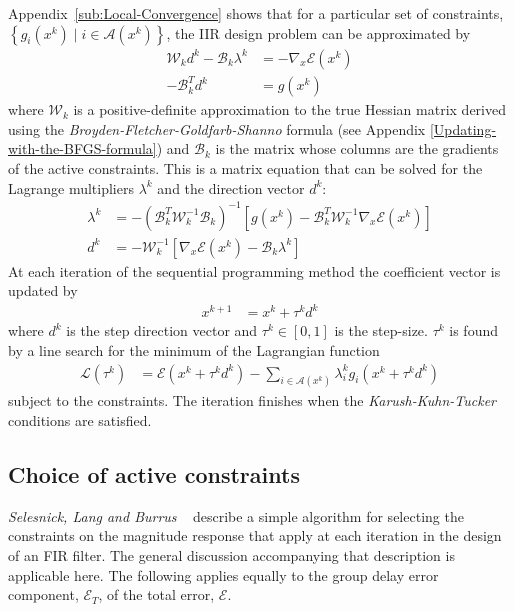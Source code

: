 \documentclass[a4paper,twoside,10pt,english]{report}
\begin{document}
Appendix~\ref{sub:Local-Convergence} shows that for a particular set of 
constraints, 
$\left\{ g_{i}\left(x^{k}\right)\mid i\in\mathcal{A}\left(x^{k}\right)\right\}$,
the IIR design problem can be approximated by 
\begin{align}
\mathcal{W}_{k}d^{k}-\mathcal{B}_{k}\lambda^{k} &= 
-\nabla_{x}\mathcal{E}\left(x^{k}\right)
\label{eqn:IIR-SQP-system}\\
-\mathcal{B}_{k}^{T}d^{k} &= g\left(x^{k}\right)\nonumber 
\end{align}
where $\mathcal{W}_{k}$ is a positive-definite approximation to the true Hessian
matrix derived using the \emph{Broyden-Fletcher-Goldfarb-Shanno} formula (see 
Appendix \ref{Updating-with-the-BFGS-formula}) and $\mathcal{B}_{k}$ is the 
matrix whose columns are the gradients of the active constraints. This is a 
matrix equation that can be solved for the Lagrange multipliers $\lambda^{k}$ 
and the direction vector $d^{k}$:
\begin{align*}
\lambda^{k} &= 
-\left(\mathcal{B}_{k}^{T}\mathcal{W}_{k}^{-1}\mathcal{B}_{k}\right)^{-1}
\left[g\left(x^{k}\right)- 
\mathcal{B}_{k}^{T}\mathcal{W}_{k}^{-1}\nabla_{x}\mathcal{E}
\left(x^{k}\right)\right]\\
d^{k} &= -\mathcal{W}_{k}^{-1}\left[\nabla_{x}\mathcal{E}\left(x^{k}\right)-
\mathcal{B}_{k}\lambda^{k}\right]
\end{align*}
At each iteration of the sequential programming method the coefficient
vector is updated by 
\begin{align*}
x^{k+1} &= x^{k}+\tau^{k}d^{k}
\end{align*}
where $d^{k}$ is the step direction vector and $\tau^{k}\in\left[0,1\right]$
is the step-size. $\tau^{k}$ is found by a line search for the minimum
of the Lagrangian function
\begin{align*}
\mathcal{L}\left(\tau^{k}\right) &= \mathcal{E}\left(x^{k}+\tau^{k}d^{k}\right)
 -\sum_{i\in\mathcal{A}\left(x^{k}\right)}\lambda_{i}^{k}
 g_{i}\left(x^{k}+\tau^{k}d^{k}\right)
\end{align*}
subject to the constraints. The iteration finishes when the
\emph{Karush-Kuhn-Tucker} conditions are satisfied.
\subsection{Choice of active constraints}
\label{sub:Choice-of-Active-Constraints}
\emph{Selesnick, Lang and Burrus} 
~\cite{SelesnickLangBurrus_ConstrainedLeastSquareFIRFilters}
describe a simple algorithm for selecting the constraints on the magnitude
response that apply at each iteration in the design of an FIR filter. The 
general discussion accompanying that description is applicable here. The 
following applies equally to the group delay error component, 
$\mathcal{E}_{T}$, of the total error, $\mathcal{E}$.
\end{document}
